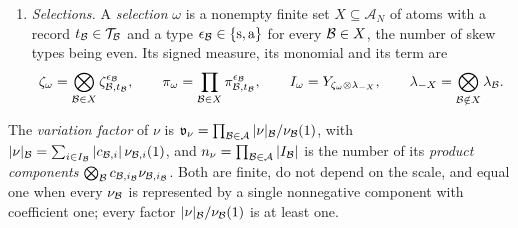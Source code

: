 \begin{definition}
\begin{enumerate}[label=(\alph*)]
\[\begin{pmatrix}
  \zeta^{\rm s}_{\Blk,t}&\tilde\pi^{\rm s}_{\Blk,t}D^{\rm s}_{\Blk,t}\end{pmatrix}
  \succeq_\iota0,\qquad
  \begin{pmatrix}\tilde\pi^{\rm a}_{\Blk,t}D^{\rm a}_{\Blk,t}&\zeta^{\rm a}_{\Blk,t}\\
  \zeta^{{\rm a}*}_{\Blk,t}&\tilde\pi^{\rm a}_{\Blk,t}D^{\rm a}_{\Blk,t}\end{pmatrix}
  \succeq_\iota0 .
 \]
 The diagonal entries are the \emph{norm envelopes} of the change; their
 coefficients carry no price. The prices are
 $\pi^\epsilon_{\Blk,t}=\tilde\pi^\epsilon_{\Blk,t}q_{\Blk}^{2a}$
 ($\epsilon\in\{{\rm s},{\rm a}\}$), $s_{\Blk}=\sum_t\pi^{\rm s}_{\Blk,t}$,
 $a_{\Blk}=\sum_t\pi^{\rm a}_{\Blk,t}$, and the totals are
 \[
  S=\sum_{\Blk}s_{\Blk},\qquad A=\sum_{\Blk}a_{\Blk}.
 \]
\item\emph{Selections.} A \emph{selection} $\omega$ is a nonempty finite set
 $X\subseteq\mathcal A_N$ of atoms with a record $t_{\mathcal B}\in\mathcal
 T_{\mathcal B}$ and a type $\epsilon_{\mathcal B}\in\{{\rm s},{\rm a}\}$ for every
 $\mathcal B\in X$, the number of skew types being even. Its signed measure, its
 monomial and its term are
 \[
  \zeta_\omega=\bigotimes_{\mathcal B\in X}\zeta^{\epsilon_{\mathcal B}}_{\mathcal B,t_{\mathcal B}},\qquad
  \pi_\omega=\prod_{\mathcal B\in X}\pi^{\epsilon_{\mathcal B}}_{\mathcal B,t_{\mathcal B}},\qquad
  I_\omega=Y_{\zeta_\omega\otimes\lambda_{-X}},\qquad
  \lambda_{-X}=\bigotimes_{\mathcal B\notin X}\lambda_{\mathcal B}.
 \]
\end{enumerate}
The \emph{variation factor} of $\nu$ is
$\mathfrak v_\nu=\prod_{\mathcal B\in\mathcal A}|\nu|_\mathcal B/\nu_\mathcal B(1)$, with
$|\nu|_\mathcal B=\sum_{i\in I_\mathcal B}|c_{\mathcal B,i}|\,\nu_{\mathcal B,i}(1)$, and
$n_\nu=\prod_{\mathcal B\in\mathcal A}|I_\mathcal B|$ is the number of its \emph{product
components} $\bigotimes_\mathcal B c_{\mathcal B,i_\mathcal B}\nu_{\mathcal B,i_\mathcal B}$. Both are
finite, do not depend on the scale, and equal one when every $\nu_\mathcal B$ is
represented by a single nonnegative component with coefficient one;
every factor $|\nu|_\mathcal B/\nu_\mathcal B(1)$ is at least one.
\end{definition}

